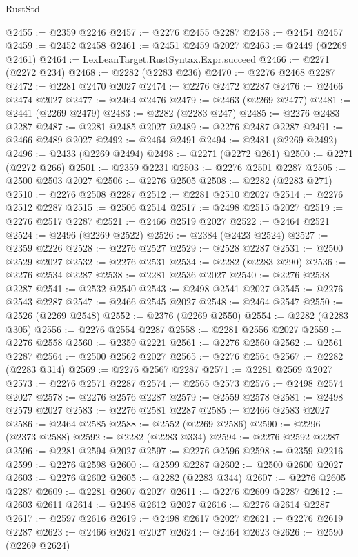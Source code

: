 \begin{lexlean}{RustStd}
\begin{coremodule}
@2455 := @2359 @2246
@2457 := @2276 @2455 @2287
@2458 := @2454 @2457
@2459 := @2452 @2458
@2461 := @2451 @2459 @2027
@2463 := @2449 (@2269 @2461)
@2464 := LexLeanTarget.RustSyntax.Expr.succeed
@2466 := @2271 (@2272 @234)
@2468 := @2282 (@2283 @236)
@2470 := @2276 @2468 @2287
@2472 := @2281 @2470 @2027
@2474 := @2276 @2472 @2287
@2476 := @2466 @2474 @2027
@2477 := @2464 @2476
@2479 := @2463 (@2269 @2477)
@2481 := @2441 (@2269 @2479)
@2483 := @2282 (@2283 @247)
@2485 := @2276 @2483 @2287
@2487 := @2281 @2485 @2027
@2489 := @2276 @2487 @2287
@2491 := @2466 @2489 @2027
@2492 := @2464 @2491
@2494 := @2481 (@2269 @2492)
@2496 := @2433 (@2269 @2494)
@2498 := @2271 (@2272 @261)
@2500 := @2271 (@2272 @266)
@2501 := @2359 @2231
@2503 := @2276 @2501 @2287
@2505 := @2500 @2503 @2027
@2506 := @2276 @2505
@2508 := @2282 (@2283 @271)
@2510 := @2276 @2508 @2287
@2512 := @2281 @2510 @2027
@2514 := @2276 @2512 @2287
@2515 := @2506 @2514
@2517 := @2498 @2515 @2027
@2519 := @2276 @2517 @2287
@2521 := @2466 @2519 @2027
@2522 := @2464 @2521
@2524 := @2496 (@2269 @2522)
@2526 := @2384 (@2423 @2524)
@2527 := @2359 @2226
@2528 := @2276 @2527
@2529 := @2528 @2287
@2531 := @2500 @2529 @2027
@2532 := @2276 @2531
@2534 := @2282 (@2283 @290)
@2536 := @2276 @2534 @2287
@2538 := @2281 @2536 @2027
@2540 := @2276 @2538 @2287
@2541 := @2532 @2540
@2543 := @2498 @2541 @2027
@2545 := @2276 @2543 @2287
@2547 := @2466 @2545 @2027
@2548 := @2464 @2547
@2550 := @2526 (@2269 @2548)
@2552 := @2376 (@2269 @2550)
@2554 := @2282 (@2283 @305)
@2556 := @2276 @2554 @2287
@2558 := @2281 @2556 @2027
@2559 := @2276 @2558
@2560 := @2359 @2221
@2561 := @2276 @2560
@2562 := @2561 @2287
@2564 := @2500 @2562 @2027
@2565 := @2276 @2564
@2567 := @2282 (@2283 @314)
@2569 := @2276 @2567 @2287
@2571 := @2281 @2569 @2027
@2573 := @2276 @2571 @2287
@2574 := @2565 @2573
@2576 := @2498 @2574 @2027
@2578 := @2276 @2576 @2287
@2579 := @2559 @2578
@2581 := @2498 @2579 @2027
@2583 := @2276 @2581 @2287
@2585 := @2466 @2583 @2027
@2586 := @2464 @2585
@2588 := @2552 (@2269 @2586)
@2590 := @2296 (@2373 @2588)
@2592 := @2282 (@2283 @334)
@2594 := @2276 @2592 @2287
@2596 := @2281 @2594 @2027
@2597 := @2276 @2596
@2598 := @2359 @2216
@2599 := @2276 @2598
@2600 := @2599 @2287
@2602 := @2500 @2600 @2027
@2603 := @2276 @2602
@2605 := @2282 (@2283 @344)
@2607 := @2276 @2605 @2287
@2609 := @2281 @2607 @2027
@2611 := @2276 @2609 @2287
@2612 := @2603 @2611
@2614 := @2498 @2612 @2027
@2616 := @2276 @2614 @2287
@2617 := @2597 @2616
@2619 := @2498 @2617 @2027
@2621 := @2276 @2619 @2287
@2623 := @2466 @2621 @2027
@2624 := @2464 @2623
@2626 := @2590 (@2269 @2624)

\end{coremodule}
\end{lexlean}
